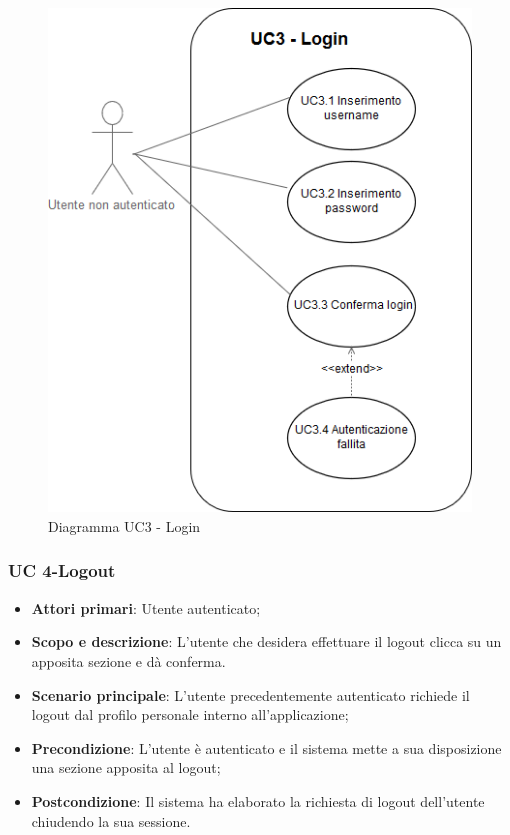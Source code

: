    \begin{figure}[h!]
           \begin{center}
           \includegraphics[scale=0.50]{immagini/3.png}
           \caption{Diagramma UC3 - Login}
           \end{center}
  \end{figure}   
          
       
        
     \subsubsection{UC 4-Logout}
        \begin{itemize}
            \item  \textbf{Attori primari}: Utente autenticato;
            \item \textbf{Scopo e descrizione}: L'utente che desidera effettuare il logout clicca su un apposita sezione e dà conferma.
            \item \textbf{Scenario principale}: L'utente precedentemente autenticato richiede il logout dal profilo personale interno all'applicazione;
            \item \textbf{Precondizione}: L'utente è autenticato e il sistema mette a sua disposizione una sezione apposita al logout;
            \item \textbf{Postcondizione}: Il sistema ha elaborato la richiesta di logout dell'utente chiudendo la sua sessione.
        \end{itemize}    
        
